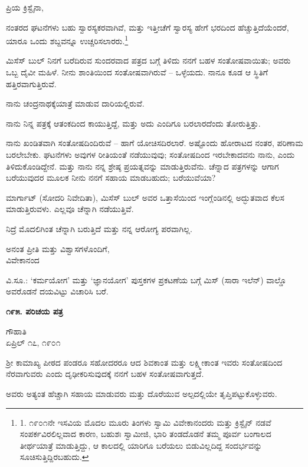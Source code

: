 ಪ್ರಿಯ ಕ್ರಿಸ್ಟೈನಾ,

ನಂತರದ ಘಟನೆಗಳು ಬಹು ಸ್ವಾರಸ್ಯಕರವಾಗಿವೆ, ಮತ್ತು ಇತ್ತೀಚೆಗೆ ಸ್ವಾರಸ್ಯ ಹೇಗೆ ಭರದಿಂದ ಹೆಚ್ಚುತ್ತಿದೆಯೆಂದರೆ, ಯಾರೂ ಒಂದು ಶಬ್ದವನ್ನೂ ಉಚ್ಚರಿಸಲಾರರು.\footnote{1. ೧೯೦೧ನೇ ಇಸವಿಯ ಮೊದಲ ಮೂರು ತಿಂಗಳು ಸ್ವಾಮಿ ವಿವೇಕಾನಂದರು ಮತ್ತು ಕ್ರಿಸ್ಟೈನ್ ನಡವೆ ಸಂಪರ್ಕವಿರಲಿಲ್ಲವಾದ ಕಾರಣ, ಬಹುಶಃ ಸ್ವಾಮೀಜಿ, ಭಾರಿ ತಂಡದೊಡನೆ ತಮ್ಮ ಪೂರ್ವ ಬಂಗಾಲದ ತೀರ್ಥಯಾತ್ರೆ ಮಾಡುತ್ತಿದ್ದು, ಆ ಕಾಲದಲ್ಲಿ ಯಾರಿಗೂ ಬರೆಯಲು ಬಿಡುವಿಲ್ಲದಿದ್ದ ಸಂದರ್ಭವನ್ನು ಸೂಚಿಸುತ್ತಿದ್ದಿರಬಹುದು.}

ಮಿಸೆಸ್ ಬುಲ್ ನಿನಗೆ ಬರೆದಿರುವ ಸುಂದರವಾದ ಪತ್ರದ ಬಗ್ಗೆ ತಿಳಿದು ನನಗೆ ಬಹಳ ಸಂತೋಷವಾಯಿತು; ಅವರು ಒಬ್ಬ ದೈವೀ ಮಹಿಳೆ. ನೀನು ಶಾಂತಿಯಿಂದ ಸಂತೋಷವಾಗಿರುವೆ – ಒಳ್ಳೆಯದು. ನಾನೂ ಕೂಡ ಆ ಸ್ಥಿತಿಗೆ ಹತ್ತಿರವಾಗುತ್ತಿರುವೆ.

ನಾನು ಚಂದ್ರನಾಥಕ್ಕೆಯಾತ್ರೆ ಮಾಡುವ ದಾರಿಯಲ್ಲಿರುವೆ.

ನಾನು ನಿನ್ನ ಪತ್ರಕ್ಕೆ ಆತಂಕದಿಂದ ಕಾಯುತ್ತಿದ್ದೆ, ಮತ್ತು ಅದು ಎಂದಿಗೂ ಬರಲಾರದೆಂದು ತೋರುತ್ತಿತ್ತು.

ನಾನು ಖಂಡಿತವಾಗಿ ಸಂತೋಷದಿಂದಿರುವೆ – ಹಾಗೆ ಯೋಚಿಸದಿರಲಾರೆ. ಅಷ್ಟೊಂದು ಹೋರಾಟದ ನಂತರ, ಪರಿಣಾಮ ಬರಲೇಬೇಕು. ಘಟನೆಗಳು ಅವುಗಳ ರೀತಿಯಂತೆ ನಡೆಯುವುವು; ಸಂತೋಷದಿಂದ ಇರಬೇಕಾದವನು ನಾನು, ಎಂದು ತಿಳಿದುಕೊಂಡಿದ್ದೇನೆ. ಮತ್ತು ನಾನು ನನ್ನ ಶ್ರೇಷ್ಠ ಪ್ರಯತ್ನವನ್ನು ಮಾಡುತ್ತಿರುವೆನು. ಚೆನ್ನಾದ ಪತ್ರಗಳನ್ನು ಆಗಾಗ ಬರೆಯುವುದರ ಮೂಲಕ ನೀನು ನನಗೆ ಸಹಾಯ ಮಾಡಬಹುದು; ಬರೆಯುವೆಯಾ?

ಮಾರ್ಗಾಟ್ (ಸೋದರಿ ನಿವೇದಿತಾ), ಮಿಸೆಸ್ ಬುಲ್ ಅವರ ಒತ್ತಾಸೆಯಿಂದ ಇಂಗ್ಲೆಂಡಿನಲ್ಲಿ ಅದ್ಭುತವಾದ ಕೆಲಸ ಮಾಡುತ್ತಿರುವಳು. ಎಲ್ಲವೂ ಚೆನ್ನಾಗಿ ನಡೆಯುತ್ತಿವೆ.

ನಿದ್ರೆ ಮೊದಲಿಗಿಂತ ಚೆನ್ನಾಗಿ ಬರುತ್ತಿದೆ ಮತ್ತು ನನ್ನ ಆರೋಗ್ಯ ಪರವಾಗಿಲ್ಲ.

\begin{flushright}
ಅನಂತ ಪ್ರೀತಿ ಮತ್ತು ವಿಶ್ವಾಸಗಳೊಂದಿಗೆ,\\ವಿವೇಕಾನಂದ
\end{flushright}

ವಿ.ಸೂ.: ‘ಕರ್ಮಯೋಗ’ ಮತ್ತು ‘ಜ್ಞಾನಯೋಗ’ ಪುಸ್ತಕಗಳ ಪ್ರಕಟಣೆಯ ಬಗ್ಗೆ ಮಿಸ್ (ಸಾರಾ ಇಲೆನ್) ವಾಲ್ಡೊ ಅವರೊಡನೆ ದಯವಿಟ್ಟು ವಿಚಾರಿಸಿ ಬರೆ.

\begin{center}
\textbf{೧೯೫. ಪರಿಚಯ ಪತ್ರ}
\end{center}

\begin{flushright}
ಗೌಹಾತಿ\\ಏಪ್ರಿಲ್ ೧೭, ೧೯೦೧
\end{flushright}

ಶ‍್ರೀ ಕಾಮಾಖ್ಯ ಪೀಠದ ಪಂಡರೂ ಸಹೋದರರೂ ಆದ ಶಿವಕಾಂತ ಮತ್ತು ಲಕ್ಷ್ಮೀಕಾಂತ ಇವರು ಸಂತೋಷದಿಂದ ನೆರವಾಗುವರು ಎಂದು ದೃಢೀಕರಿಸುವುದಕ್ಕೆ ನನಗೆ ಬಹಳ ಸಂತೋಷವಾಗುತ್ತದೆ.

ಅವರು ಅತ್ಯಂತ ಹೆಚ್ಚಾಗಿ ಸಹಾಯ ಮಾಡುವರು ಮತ್ತು ದೊರೆಯುವ ಅಲ್ಪದಲ್ಲಿಯೇ ತೃಪ್ತಿಪಟ್ಟುಕೊಳ್ಳುವರು.

